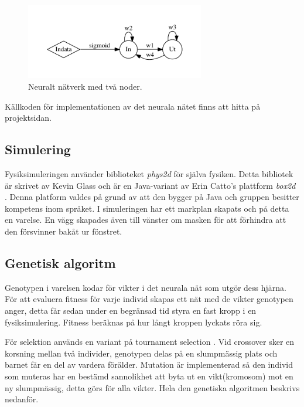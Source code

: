 \documentclass[titlepage, twocolumn, a4paper, 11pt, swedish]{article}
\begin{document}
\begin{figure}[H]
  \begin{center}
    \includegraphics[width=78mm]{images/neuralnet.pdf}
    \caption{Neuralt nätverk med två noder.}
    \label{fig:neuralnet.pdf}
  \end{center}
\end{figure}


Källkoden för implementationen av det neurala nätet finns att hitta på projektsidan.
\subsection{Simulering}
Fysiksimuleringen använder biblioteket \textit{phys2d} \cite{phys2d} för själva fysiken. Detta bibliotek är skrivet av Kevin Glass och är en Java-variant av Erin Catto's plattform \textit{box2d} \cite{box2d}. Denna platform valdes på grund av att den bygger på Java och gruppen besitter kompetens inom språket. I simuleringen har ett markplan skapats och på detta en varelse. En vägg skapades även till vänster om masken för att förhindra att den försvinner bakåt ur fönstret.

\subsection{Genetisk algoritm}
Genotypen i varelsen kodar för vikter i det neurala nät som utgör dess hjärna. För att evaluera fitness för varje individ skapas ett nät med de vikter genotypen anger, detta får sedan under en begränsad tid styra en fast kropp i en fysiksimulering. Fitness beräknas på hur långt kroppen lyckats röra sig.

För selektion används en variant på tournament selection \cite{tournament}.
Vid crossover sker en korsning mellan två individer, genotypen delas på en slumpmässig plats och barnet får en del av vardera förälder. Mutation är implementerad så den individ som muteras har en bestämd sannolikhet att byta ut en vikt(kromosom) mot en ny slumpmässig, detta görs för alla vikter. Hela den genetiska algoritmen beskrivs nedanför.
\end{document}
